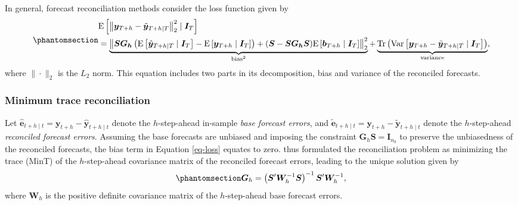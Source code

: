 \documentclass[
  11pt]{article}
\theoremstyle{plain}
\theoremstyle{remark}
\begin{document}
In general, forecast reconciliation methods consider the loss function
\citep{Ben_Taieb2019-be} given by
\begin{equation}\phantomsection\label{eq-loss}{
\begin{aligned}
& \mathrm{E}\left[\left\|\bm{y}_{T+h}-\tilde{\bm{y}}_{T+h \mid T}\right\|_2^2 \mid \bm{I}_T\right] \\
& =\underbrace{\left\|\bm{S G_h}\left(\mathrm{E}\left[\hat{\bm{y}}_{T+h \mid T} \mid \bm{I}_T\right]-\mathrm{E}\left[\bm{y}_{T+h} \mid \bm{I}_T\right]\right)+(\bm{S}-\bm{S G_h S}) \mathrm{E}\left[\bm{b}_{T+h} \mid \bm{I}_T\right]\right\|_2^2}_{\text{bias}^2} +\underbrace{\operatorname{Tr}\left(\operatorname{Var}\left[\bm{y}_{T+h}-\tilde{\bm{y}}_{T+h \mid T} \mid \bm{I}_T\right]\right)}_{\text{variance}},
\end{aligned}
}\end{equation} where \(\|\cdot\|_2\) is the \(L_2\) norm. This equation
includes two parts in its decomposition, bias and variance of the
reconciled forecasts.

\subsubsection*{Minimum trace
reconciliation}\label{minimum-trace-reconciliation}

Let
\(\hat{\bm{e}}_{t+h \mid t} = \bm{y}_{t+h} - \hat{\bm{y}}_{t+h \mid t}\)
denote the \(h\)-step-ahead in-sample \emph{base forecast errors}, and
\(\tilde{\bm{e}}_{t+h \mid t} = \bm{y}_{t+h} - \tilde{\bm{y}}_{t+h \mid t}\)
denote the \(h\)-step-ahead \emph{reconciled forecast errors}. Assuming
the base forecasts are unbiased and imposing the constraint
\(\bm{G}_h\bm{ S}=\bm{I}_{n_b}\) to preserve the unbiasedness of the
reconciled forecasts, the bias term in Equation \eqref{eq-loss} equates
to zero. \citet{Wickramasuriya2019-fc} thus formulated the
reconciliation problem as minimizing the trace (MinT) of the
\(h\)-step-ahead covariance matrix of the reconciled forecast errors,
leading to the unique solution given by
\begin{equation}\phantomsection\label{eq-mint}{
\bm{G}_h=\left(\bm{S}^{\prime} \bm{W}_h^{-1} \bm{S}\right)^{-1} \bm{S}^{\prime} \bm{W}_h^{-1},
}\end{equation} where \(\bm{W}_h\) is the positive definite covariance
matrix of the \(h\)-step-ahead base forecast errors.
\end{document}
